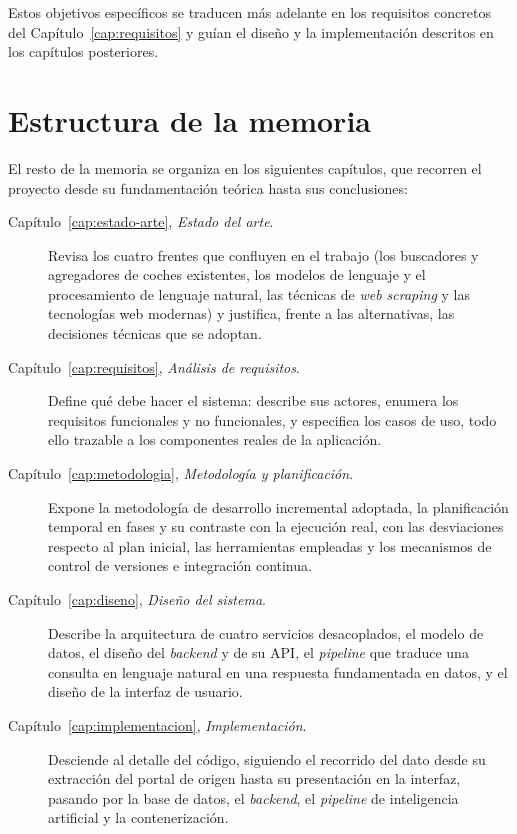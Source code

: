 Estos objetivos específicos se traducen más adelante en los requisitos concretos
del Capítulo~\ref{cap:requisitos} y guían el diseño y la implementación descritos
en los capítulos posteriores.

\section{Estructura de la memoria}
\label{sec:intro-estructura}

El resto de la memoria se organiza en los siguientes capítulos, que recorren el
proyecto desde su fundamentación teórica hasta sus conclusiones:

\begin{description}
  \item[Capítulo~\ref{cap:estado-arte}, \emph{Estado del arte}.] Revisa los
        cuatro frentes que confluyen en el trabajo (los buscadores y agregadores
        de coches existentes, los modelos de lenguaje y el procesamiento de
        lenguaje natural, las técnicas de \emph{web scraping} y las tecnologías web
        modernas) y justifica, frente a las alternativas, las decisiones técnicas
        que se adoptan.

  \item[Capítulo~\ref{cap:requisitos}, \emph{Análisis de requisitos}.] Define qué
        debe hacer el sistema: describe sus actores, enumera los requisitos
        funcionales y no funcionales, y especifica los casos de uso, todo ello
        trazable a los componentes reales de la aplicación.

  \item[Capítulo~\ref{cap:metodologia}, \emph{Metodología y planificación}.]
        Expone la metodología de desarrollo incremental adoptada, la planificación
        temporal en fases y su contraste con la ejecución real, con las
        desviaciones respecto al plan inicial, las herramientas empleadas y los
        mecanismos de control de versiones e integración continua.

  \item[Capítulo~\ref{cap:diseno}, \emph{Diseño del sistema}.] Describe la
        arquitectura de cuatro servicios desacoplados, el modelo de datos, el
        diseño del \emph{backend} y de su API, el \emph{pipeline} que traduce una
        consulta en lenguaje natural en una respuesta fundamentada en datos, y el
        diseño de la interfaz de usuario.

  \item[Capítulo~\ref{cap:implementacion}, \emph{Implementación}.] Desciende al
        detalle del código, siguiendo el recorrido del dato desde su extracción del
        portal de origen hasta su presentación en la interfaz, pasando por la base
        de datos, el \emph{backend}, el \emph{pipeline} de inteligencia artificial
        y la contenerización.


\end{description}
